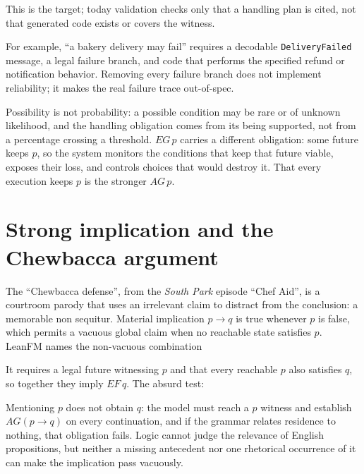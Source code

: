 \noindent This is the target; today validation checks only that a handling plan
is cited, not that generated code exists or covers the witness.

For example, ``a bakery delivery may fail'' requires a decodable
\texttt{DeliveryFailed} message, a legal failure branch, and code that performs
the specified refund or notification behavior. Removing every failure branch
does not implement reliability; it makes the real failure trace out-of-spec.

Possibility is not probability: a possible condition may be rare or of unknown
likelihood, and the handling obligation comes from its being supported, not from a
percentage crossing a threshold. $EG\,p$ carries a different obligation: some
future keeps $p$, so the system monitors the conditions that keep that future
viable, exposes their loss, and controls choices that would destroy it. That every
execution keeps $p$ is the stronger $AG\,p$.

\section{Strong implication and the Chewbacca argument}

The ``Chewbacca defense'', from the \emph{South Park} episode ``Chef Aid'', is a
courtroom parody that uses an irrelevant claim to distract from the conclusion: a
memorable non sequitur. Material implication $p\mathbin{\to}q$ is true whenever $p$
is false, which permits a vacuous global claim when no reachable state satisfies
$p$. LeanFM names the non-vacuous combination


It requires a legal future witnessing $p$ and that every reachable $p$ also
satisfies $q$, so together they imply $EF\,q$. The absurd test:


Mentioning $p$ does not obtain $q$: the model must reach a $p$ witness and
establish $AG(p\to q)$ on every continuation, and if the grammar relates residence
to nothing, that obligation fails. Logic cannot judge the relevance of English
propositions, but neither a missing antecedent nor one rhetorical occurrence of it
can make the implication pass vacuously.

